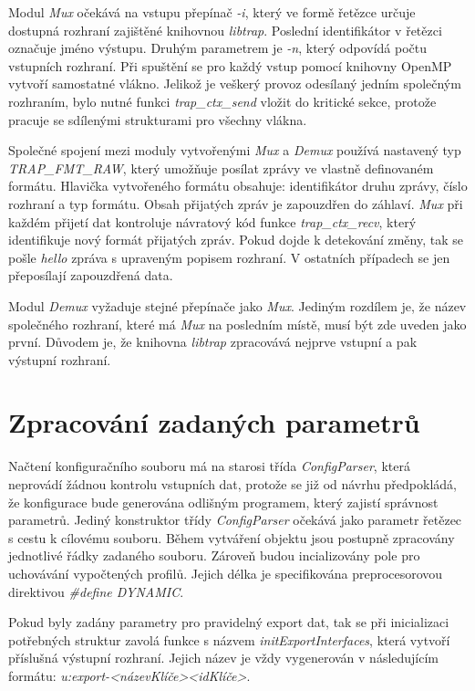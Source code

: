  Modul \textit{Mux} očekává na vstupu přepínač \textit{-i}, který ve formě řetězce určuje dostupná 
 rozhraní 
 zajištěné knihovnou \textit{libtrap}. Poslední identifikátor v řetězci označuje jméno 
 výstupu. Druhým parametrem je \textit{-n}, který odpovídá počtu vstupních rozhraní. Při spuštění 
 se pro každý vstup pomocí knihovny OpenMP vytvoří samostatné vlákno. Jelikož je veškerý provoz 
 odesílaný jedním společným rozhraním, bylo nutné funkci \textit{trap\_ctx\_send} vložit do
 kritické sekce, 
 protože pracuje se sdílenými strukturami pro všechny vlákna.
 
 Společné spojení mezi moduly vytvořenými \textit{Mux} a \textit{Demux} používá nastavený typ
 \textit{TRAP\_FMT\_RAW},
 který umožňuje posílat zprávy ve vlastně definovaném formátu. Hlavička vytvořeného formátu
 obsahuje: identifikátor druhu zprávy, číslo rozhraní a typ formátu. Obsah přijatých zpráv
 je zapouzdřen do záhlaví. \textit{Mux} při každém přijetí dat kontroluje návratový
 kód funkce \textit{trap\_ctx\_recv}, který identifikuje nový formát přijatých zpráv. Pokud
 dojde k detekování změny, tak se pošle \textit{hello} zpráva s upraveným popisem rozhraní.
 V ostatních případech se jen přeposílají zapouzdřená data.
 
 Modul \textit{Demux} vyžaduje stejné přepínače jako \textit{Mux}. Jediným rozdílem je, že 
 název společného rozhraní, které má \textit{Mux} na posledním místě, musí být zde uveden 
 jako první. Důvodem je, že knihovna \textit{libtrap} zpracovává nejprve vstupní a pak
 výstupní rozhraní. 
 
\section{Zpracování zadaných parametrů}

Načtení konfiguračního souboru má na starosi třída \textit{ConfigParser}, která neprovádí 
žádnou kontrolu vstupních dat, protože se již od návrhu předpokládá, že konfigurace bude 
generována odlišným programem, který zajistí správnost parametrů. Jediný konstruktor třídy
 \textit{ConfigParser} očekává jako parametr řetězec s cestu k cílovému souboru. Během vytváření
 objektu jsou postupně zpracovány jednotlivé řádky zadaného souboru. Zároveň budou incializovány
 pole pro uchovávání vypočtených profilů. Jejich délka je specifikována preprocesorovou direktivou
 \textit{\#define DYNAMIC}.
 
Pokud byly zadány parametry pro pravidelný export dat, tak se při inicializaci potřebných struktur
zavolá funkce s názvem \textit{initExportInterfaces}, která vytvoří příslušná výstupní 
rozhraní. Jejich název je vždy vygenerován v následujícím formátu: 
\textit{u:export-<názevKlíče><idKlíče>}.
   
